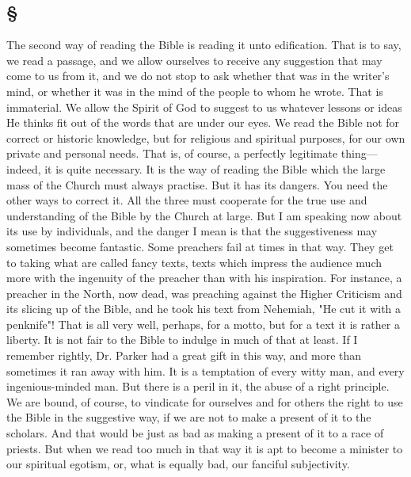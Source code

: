 \documentclass[draft]{ptfdoc}
\begin{document}
\subsection*{
\S
}

The second way of reading the Bible is reading 
it unto edification. That is to say, we read 
a passage, and we allow ourselves to receive 
any suggestion that may come to us from it, 
and we do not stop to ask whether that was in 
the writer's mind, or whether it was in the 
mind of the people to whom he wrote. That is 
immaterial. We allow the Spirit of God to 
suggest to us whatever lessons or ideas He 
thinks fit out of the words that are under our 
eyes. We read the Bible not for correct 
or historic knowledge, but for religious and 
spiritual purposes, for our own private and 
personal needs. That is, of course, a perfectly 
legitimate thing---indeed, it is quite necessary. 
It is the way of reading the Bible which the 
large mass of the Church must always practise. 
But it has its dangers. You need the other 
ways to correct it. All the three must cooperate 
for the true use and understanding of 
the Bible by the Church at large. But I am 
speaking now about its use by individuals, 
and the danger I mean is that the suggestiveness
may sometimes become fantastic. Some 
preachers fail at times in that way. They get 
to taking what are called fancy texts, texts 
which impress the audience much more with 
the ingenuity of the preacher than with his 
inspiration. For instance, a preacher in the 
North, now dead, was preaching against the 
Higher Criticism and its slicing up of the 
Bible, and he took his text from Nehemiah, 
"He cut it with a penknife"! That is all very 
well, perhaps, for a motto, but for a text it 
is rather a liberty. It is not fair to the Bible 
to indulge in much of that at least. If I remember 
rightly, Dr. Parker had a great gift in 
this way, and more than sometimes it ran away 
with him. It is a temptation of every witty 
man, and every ingenious-minded man. But 
there is a peril in it, the abuse of a right principle. 
We are bound, of course, to vindicate 
for ourselves and for others the right to use the 
Bible in the suggestive way, if we are not to 
make a present of it to the scholars. And that 
would be just as bad as making a present of it 
to a race of priests. But when we read too 
much in that way it is apt to become a minister 
to our spiritual egotism, or, what is equally bad, 
our fanciful subjectivity. 
\end{document}
